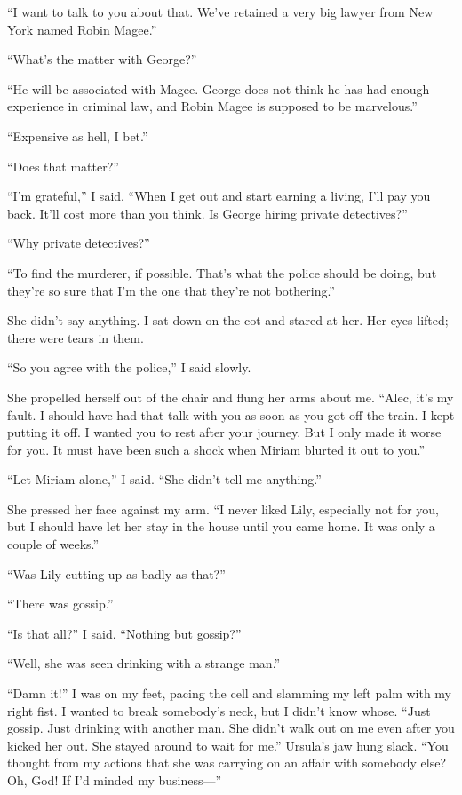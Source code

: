 {“I want to talk to you about that. We’ve retained a very big lawyer from New York named Robin Magee.”

“What’s the matter with George?”

“He will be associated with Magee. George does not think he has had enough experience in criminal law, and Robin Magee is supposed to be marvelous.”

“Expensive as hell, I bet.”

“Does that matter?”

“I’m grateful,” I said. “When I get out and start earning a living, I’ll pay you back. It’ll cost more than you think. Is George hiring private detectives?”

“Why private detectives?”

“To find the murderer, if possible. That’s what the police should be doing, but they’re so sure that I’m the one that they’re not bothering.”

She didn’t say anything. I sat down on the cot and stared at her. Her eyes lifted; there were tears in them.

“So you agree with the police,” I said slowly.

She propelled herself out of the chair and flung her arms about me. “Alec, it’s my fault. I should have had that talk with you as soon as you got off the train. I kept putting it off. I wanted you to rest after your journey. But I only made it worse for you. It must have been such a shock when Miriam blurted it out to you.”

“Let Miriam alone,” I said. “She didn’t tell me anything.”

She pressed her face against my arm. “I never liked Lily, especially not for you, but I should have let her stay in the house until you came home. It was only a couple of weeks.”

“Was Lily cutting up as badly as that?”

“There was gossip.”

“Is that all?” I said. “Nothing but gossip?”

“Well, she was seen drinking with a strange man.”

“Damn it!” I was on my feet, pacing the cell and slamming my left palm with my right fist. I wanted to break somebody’s neck, but I didn’t know whose. “Just gossip. Just drinking with another man. She didn’t walk out on me even after you kicked her out. She stayed around to wait for me.” Ursula’s jaw hung slack. “You thought from my actions that she was carrying on an affair with somebody else? Oh, God! If I’d minded my business—”

}
